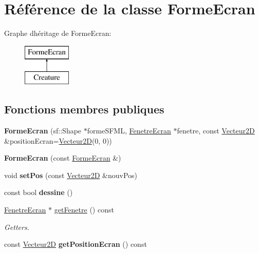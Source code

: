 \hypertarget{class_forme_ecran}{}\section{Référence de la classe Forme\+Ecran}
\label{class_forme_ecran}
Graphe d\textquotesingle{}héritage de Forme\+Ecran\+:\begin{figure}[H]
\begin{center}
\leavevmode
\includegraphics[height=2.000000cm]{class_forme_ecran}
\end{center}
\end{figure}
\subsection*{Fonctions membres publiques}
\begin{DoxyCompactItemize}
\item 
\mbox{\label{class_forme_ecran_a719711c110f071c2924fd2a3dc3ae040}} 
{\bfseries Forme\+Ecran} (sf\+::\+Shape $\ast$forme\+S\+F\+ML, \mbox{\hyperlink{class_fenetre_ecran}{Fenetre\+Ecran}} $\ast$fenetre, const \mbox{\hyperlink{class_vecteur2_d}{Vecteur2D}} \&position\+Ecran=\mbox{\hyperlink{class_vecteur2_d}{Vecteur2D}}(0, 0))
\item 
\mbox{\label{class_forme_ecran_a389a4eef0f47f3451440113055453052}} 
{\bfseries Forme\+Ecran} (const \mbox{\hyperlink{class_forme_ecran}{Forme\+Ecran}} \&)
\item 
\mbox{\label{class_forme_ecran_aa96940cf8b569c9ba9376d3d4accba80}} 
void {\bfseries set\+Pos} (const \mbox{\hyperlink{class_vecteur2_d}{Vecteur2D}} \&nouv\+Pos)
\item 
\mbox{\label{class_forme_ecran_abd24ffecc0acb7f75635dd5a9b96cc63}} 
const bool {\bfseries dessine} ()
\item 
\mbox{\label{class_forme_ecran_a781177121ce901c848958800e0ce12ec}} 
\mbox{\hyperlink{class_fenetre_ecran}{Fenetre\+Ecran}} $\ast$ \mbox{\hyperlink{class_forme_ecran_a781177121ce901c848958800e0ce12ec}{get\+Fenetre}} () const
\begin{DoxyCompactList}\small\item\em Getters. \end{DoxyCompactList}\item 
\mbox{\label{class_forme_ecran_a6bf6d1c849fed205f2fc7f1a822ee383}} 
const \mbox{\hyperlink{class_vecteur2_d}{Vecteur2D}} {\bfseries get\+Position\+Ecran} () const
\end{DoxyCompactItemize}
